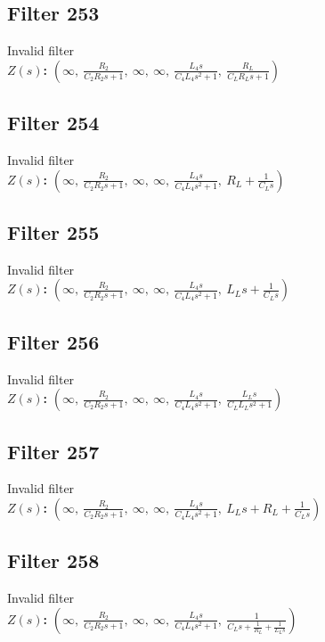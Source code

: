 \documentclass{article}
\begin{document}
\subsection*{Filter 253}
Invalid filter \\ 
\textbf{$Z(s)$:} $\left( \infty, \  \frac{R_{2}}{C_{2} R_{2} s + 1}, \  \infty, \  \infty, \  \frac{L_{4} s}{C_{4} L_{4} s^{2} + 1}, \  \frac{R_{L}}{C_{L} R_{L} s + 1}\right)$ \\ 
\subsection*{Filter 254}
Invalid filter \\ 
\textbf{$Z(s)$:} $\left( \infty, \  \frac{R_{2}}{C_{2} R_{2} s + 1}, \  \infty, \  \infty, \  \frac{L_{4} s}{C_{4} L_{4} s^{2} + 1}, \  R_{L} + \frac{1}{C_{L} s}\right)$ \\ 
\subsection*{Filter 255}
Invalid filter \\ 
\textbf{$Z(s)$:} $\left( \infty, \  \frac{R_{2}}{C_{2} R_{2} s + 1}, \  \infty, \  \infty, \  \frac{L_{4} s}{C_{4} L_{4} s^{2} + 1}, \  L_{L} s + \frac{1}{C_{L} s}\right)$ \\ 
\subsection*{Filter 256}
Invalid filter \\ 
\textbf{$Z(s)$:} $\left( \infty, \  \frac{R_{2}}{C_{2} R_{2} s + 1}, \  \infty, \  \infty, \  \frac{L_{4} s}{C_{4} L_{4} s^{2} + 1}, \  \frac{L_{L} s}{C_{L} L_{L} s^{2} + 1}\right)$ \\ 
\subsection*{Filter 257}
Invalid filter \\ 
\textbf{$Z(s)$:} $\left( \infty, \  \frac{R_{2}}{C_{2} R_{2} s + 1}, \  \infty, \  \infty, \  \frac{L_{4} s}{C_{4} L_{4} s^{2} + 1}, \  L_{L} s + R_{L} + \frac{1}{C_{L} s}\right)$ \\ 
\subsection*{Filter 258}
Invalid filter \\ 
\textbf{$Z(s)$:} $\left( \infty, \  \frac{R_{2}}{C_{2} R_{2} s + 1}, \  \infty, \  \infty, \  \frac{L_{4} s}{C_{4} L_{4} s^{2} + 1}, \  \frac{1}{C_{L} s + \frac{1}{R_{L}} + \frac{1}{L_{L} s}}\right)$ \\ 
\end{document}
